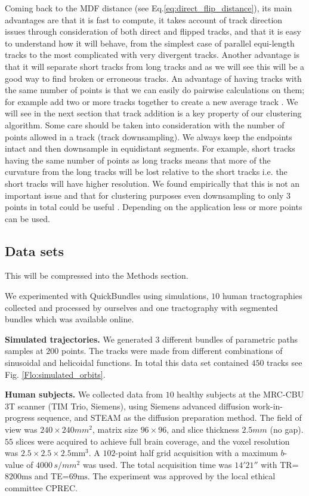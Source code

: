 \documentclass[preprint,authoryear,a4paper,10pt,onecolumn]{elsarticle}
\begin{document}
Coming back to the MDF distance (see Eq.\ref{eq:direct_flip_distance}),
its main advantages are that it is fast to compute, it takes account
of track direction issues through consideration of both direct and
flipped tracks, and that it is easy to understand how it will behave,
from the simplest case of parallel equi-length tracks to the most
complicated with very divergent tracks. Another advantage is that
it will separate short tracks from long tracks and as we will see
this will be a good way to find broken or erroneous tracks. An advantage
of having tracks with the same number of points is that we can easily
do pairwise calculations on them; for example add two or more tracks
together to create a new average track . We will see in the next section
that track addition is a key property of our clustering algorithm.
Some care should be taken into consideration with the number of points
allowed in a track (track downsampling). We always keep the endpoints
intact and then downsample in equidistant segments. For example, short
tracks having the same number of points as long tracks means that
more of the curvature from the long tracks will be lost relative to
the short tracks i.e. the short tracks will have higher resolution.
We found empirically that this is not an important issue and that
for clustering purposes even downsampling to only $3$ points in total
could be useful \cite{EGMB10}. Depending on the application less
or more points can be used. 


\subsection{\label{sub:QB-Data-sets}Data sets}

This will be compressed into the Methods section.

We experimented with QuickBundles using simulations, $10$ human
tractographies collected and processed by ourselves and one tractography
with segmented bundles which was available online.

\textbf{Simulated trajectories.} We generated $3$ different bundles of
parametric paths samples at $200$ points. The tracks were made from
different combinations of sinusoidal and helicoidal functions.  In total
this data set contained $450$ tracks see Fig. \ref{Flo:simulated_orbits}.

\textbf{Human subjects. }We collected data from $10$ healthy subjects at
the MRC-CBU 3T scanner (TIM Trio, Siemens), using Siemens advanced
diffusion work-in-progress sequence, and STEAM
\cite{merboldt1992diffusion,MAB04} as the diffusion preparation
method. The field of view was $240\times240mm^{2}$, matrix size
$96\times96$, and slice thickness $2.5mm$ (no gap).  $55$ slices were
acquired to achieve full brain coverage, and the voxel resolution was
$2.5\times2.5\times2.5\textrm{mm}{}^{3}$. A $102$-point half grid
acquisition\cite{Yeh2010} with a maximum $b$-value of $4000\, s/mm^{2}$
was used. The total acquisition time was $14'21''$ with
TR=$8200\textrm{ms}$ and TE=$69\textrm{ms}$. The experiment was approved
by the local ethical committee CPREC.
\end{document}
